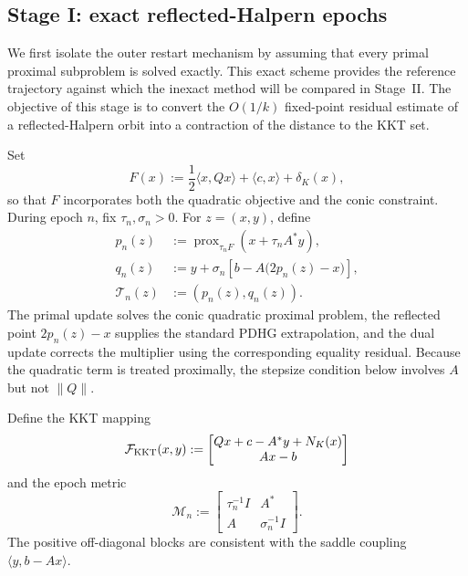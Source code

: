\documentclass[letterpaper]{article} %
\theoremstyle{definition}
\theoremstyle{remark}
\begin{document}
\subsection{Stage I: exact reflected-Halpern epochs}

We first isolate the outer restart mechanism by assuming that every primal
proximal subproblem is solved exactly.  This exact scheme provides the
reference trajectory against which the inexact method will be compared in
Stage~II.  The objective of this stage is to convert the $O(1/k)$ fixed-point
residual estimate of a reflected-Halpern orbit into a contraction of the
distance to the KKT set.

Set
\[
    F(x)
    :=
    \frac12\langle x,Qx\rangle+\langle c,x\rangle+\delta_K(x),
\]
so that $F$ incorporates both the quadratic objective and the conic
constraint.  During epoch $n$, fix $\tau_n,\sigma_n>0$.  For $z=(x,y)$,
define
\begin{subequations}
\label{eq:theory-pdhg-map}
\begin{align}
    p_n(z)
    &:=
    \operatorname{prox}_{\tau_nF}(x+\tau_nA^*y),
    \label{eq:theory-primal-step}\\
    q_n(z)
    &:=
    y+\sigma_n\left[b-A\bigl(2p_n(z)-x\bigr)\right],
    \label{eq:theory-dual-step}\\
    \mathcal T_n(z)
    &:=
    (p_n(z),q_n(z)).
    \label{eq:theory-map-definition}
\end{align}
\end{subequations}
The primal update solves the conic quadratic proximal problem, the reflected
point $2p_n(z)-x$ supplies the standard PDHG extrapolation, and the dual update
corrects the multiplier using the corresponding equality residual.  Because
the quadratic term is treated proximally, the stepsize condition below
involves $A$ but not $\|Q\|$.

Define the KKT mapping
\begin{equation}
\label{eq:kkt-map}
    \mathcal F_{\rm KKT}(x,y)
    :=
    \begin{bmatrix}
        Qx+c-A^*y+N_K(x)\\
        Ax-b
    \end{bmatrix}
\end{equation}
and the epoch metric
\begin{equation}
\label{eq:pdhg-metric}
    \mathcal M_n
    :=
    \begin{bmatrix}
        \tau_n^{-1}I&A^*\\
        A&\sigma_n^{-1}I
    \end{bmatrix}.
\end{equation}
The positive off-diagonal blocks are consistent with the saddle coupling
$\langle y,b-Ax\rangle$.
\end{document}
